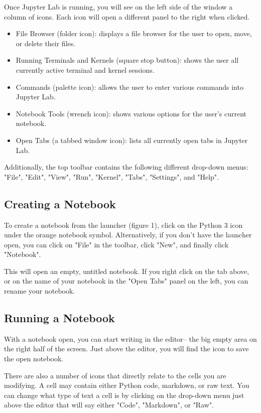 \documentclass[pdftex,12pt]{artikel3}
\begin{document}
Once Jupyter Lab is running, you will see on the left side of the window a column of icons. 
Each icon will open a different panel to the right when clicked. 

\begin{itemize}
    \item File Browser (folder icon): displays a file browser for the user to open, move, or delete their files.
    \item Running Terminals and Kernels (square stop button): shows the user all currently active terminal and kernel sessions.
    \item Commands (palette icon): allows the user to enter various commands into Jupyter Lab.
    \item Notebook Tools (wrench icon): shows various options for the user's current notebook.
    \item Open Tabs (a tabbed window icon): lists all currently open tabs in Jupyter Lab.
\end{itemize}

Additionally, the top toolbar contains the following different drop-down menus: "File", "Edit", "View", "Run", "Kernel", "Tabs", "Settings", and "Help".

\subsection{Creating a Notebook}

To create a notebook from the launcher (figure 1), click on the Python 3 icon under the orange notebook symbol. Alternatively, if you don't have the launcher open, you can click on "File" in the toolbar, click "New", and finally click "Notebook".

This will open an empty, untitled notebook. If you right click on the tab above, or on the name of your notebook in the "Open Tabs" panel on the left, you can rename your notebook.

\subsection{Running a Notebook}

With a notebook open, you can start writing in the editor-- the big empty area on the right half of the screen. Just above the editor, you will find the icon to save the open notebook.

There are also a number of icons that directly relate to the cells you are modifying. A cell may contain either Python code, markdown, or raw text. You can change what type of text a cell is by clicking on the drop-down menu just above the editor that will say either "Code", "Markdown", or "Raw".
\end{document}
